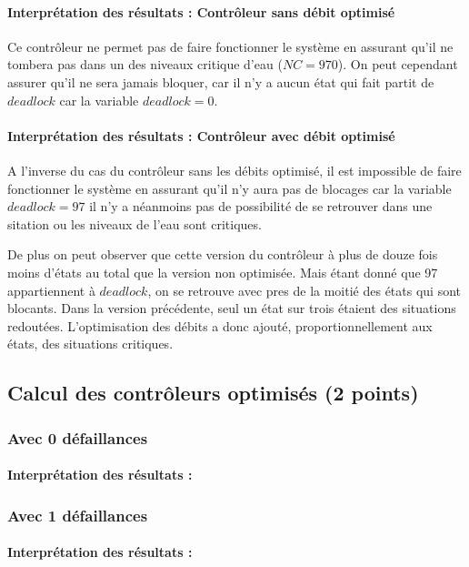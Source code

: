 \documentclass[a4paper]{book}
\begin{document}
\paragraph{Interprétation des résultats : Contrôleur sans débit optimisé}
Ce contrôleur ne permet pas de faire fonctionner le système en assurant qu'il ne tombera pas dans un des niveaux critique d'eau ($NC = 970$).
On peut cependant assurer qu'il ne sera jamais bloquer, car il n'y a aucun état qui fait partit de $deadlock$ car la variable $deadlock=0$.


\paragraph{Interprétation des résultats : Contrôleur avec débit optimisé}
A l'inverse du cas du contrôleur sans les débits optimisé, il est impossible de faire fonctionner le système en assurant qu'il n'y aura pas de blocages car la variable $deadlock = 97$
il n'y a néanmoins pas de possibilité de se retrouver dans une sitation ou les niveaux de l'eau sont critiques.

De plus on peut observer que cette version du contrôleur à plus de douze fois moins d'états au total que la version non optimisée. Mais étant donné que 97 appartiennent à $deadlock$, on se retrouve avec pres de la moitié des états qui sont blocants.
Dans la version précédente, seul un état sur trois étaient des situations redoutées. L'optimisation des débits a donc ajouté, proportionnellement aux états, des situations critiques.

\subsection{Calcul des contrôleurs optimisés (2 points)}
\subsubsection{Avec 0 défaillances}

\paragraph{Interprétation des résultats : }

\subsubsection{Avec 1 défaillances}

\paragraph{Interprétation des résultats : }
\end{document}
